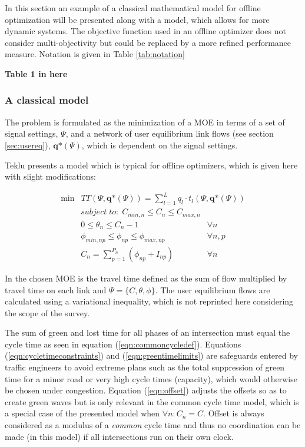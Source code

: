 \label{sec:model}

In this section an example of a classical mathematical model for
offline optimization will be presented along with a model, which
allows for more dynamic systems. The objective function used in an
offline optimizer does not consider multi-objectivity but could be
replaced by a more refined performance measure. Notation is given in Table \ref{tab:notation}

\begin{center}
{\bf Table 1 in here}
\end{center}

\subsubsection*{A classical model}

The problem is formulated as the minimization of a MOE in terms of a
set of signal settings, $\Psi$, and a network of user equilibrium link
flows (see section \ref{sec:usereq}), $\textbf{q*}(\Psi)$, which is
dependent on the signal settings.

Teklu \citet{2} presents a model which is typical for offline optimizers, which is given here with slight modifications:

\begin{eqnarray}
\min & TT(\Psi, \textbf{q*}\left( \Psi\right)) = \displaystyle\sum_{l = 1}^{L} q_l \cdot t_l(\Psi,\textbf{q*}(\Psi))
\end{eqnarray}
\begin{eqnarray}
\label{eqn:cycletimeconstraints} subject\;to:\;C_{min,n} \leq C_n \leq C_{max,n} & \\
\label{eqn:offset} 0 \leq \theta_n \leq C_n-1 & \forall n \\
\label{eqn:greentimelimits} \phi_{min,np} \leq \phi_{np} \leq \phi_{max,np} & \forall n,p \\
\label{eqn:commoncycledef} C_n = \sum_{p=1}^{P_n} ( \phi_{np} + I_{np} ) & \forall n
\end{eqnarray}

In \citet{2} the chosen MOE is the travel time defined as the sum of flow
multiplied by travel time on each link and $\Psi = \lbrace
C,\theta,\phi \rbrace$. The user equilibrium flows are calculated
using a variational inequality, which is not reprinted here
considering the scope of the survey.

The sum of green and lost time for all phases of an intersection must
equal the cycle time as seen in equation
(\ref{eqn:commoncycledef}). Equations (\ref{eqn:cycletimeconstraints})
and (\ref{eqn:greentimelimits}) are safeguards entered by traffic
engineers to avoid extreme plans such as the total suppression of green
time for a minor road or very high cycle times (capacity), which would
otherwise be chosen under congestion. Equation (\ref{eqn:offset})
adjusts the offsets so as to create green waves but is only relevant
in the common cycle time model, which is a special case of the
presented model when $\forall n : C_n = C$. Offset is always
considered as a modulus of a \textit{common} cycle time and thus no
coordination can be made (in this model) if all intersections run on
their own clock.

